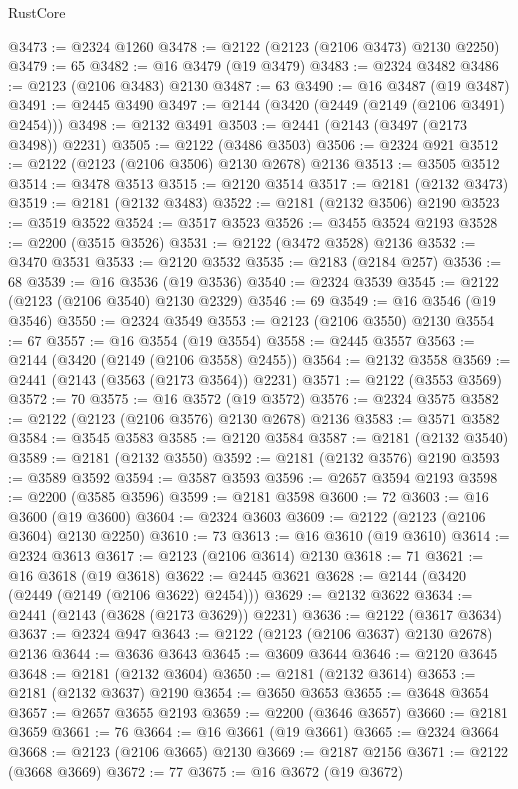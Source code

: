 \begin{lexlean}{RustCore}
\begin{coremodule}
@3473 := @2324 @1260
@3478 := @2122 (@2123 (@2106 @3473) @2130 @2250)
@3479 := 65
@3482 := @16 @3479 (@19 @3479)
@3483 := @2324 @3482
@3486 := @2123 (@2106 @3483) @2130
@3487 := 63
@3490 := @16 @3487 (@19 @3487)
@3491 := @2445 @3490
@3497 := @2144 (@3420 (@2449 (@2149 (@2106 @3491) @2454)))
@3498 := @2132 @3491
@3503 := @2441 (@2143 (@3497 (@2173 @3498)) @2231)
@3505 := @2122 (@3486 @3503)
@3506 := @2324 @921
@3512 := @2122 (@2123 (@2106 @3506) @2130 @2678) @2136
@3513 := @3505 @3512
@3514 := @3478 @3513
@3515 := @2120 @3514
@3517 := @2181 (@2132 @3473)
@3519 := @2181 (@2132 @3483)
@3522 := @2181 (@2132 @3506) @2190
@3523 := @3519 @3522
@3524 := @3517 @3523
@3526 := @3455 @3524 @2193
@3528 := @2200 (@3515 @3526)
@3531 := @2122 (@3472 @3528) @2136
@3532 := @3470 @3531
@3533 := @2120 @3532
@3535 := @2183 (@2184 @257)
@3536 := 68
@3539 := @16 @3536 (@19 @3536)
@3540 := @2324 @3539
@3545 := @2122 (@2123 (@2106 @3540) @2130 @2329)
@3546 := 69
@3549 := @16 @3546 (@19 @3546)
@3550 := @2324 @3549
@3553 := @2123 (@2106 @3550) @2130
@3554 := 67
@3557 := @16 @3554 (@19 @3554)
@3558 := @2445 @3557
@3563 := @2144 (@3420 (@2149 (@2106 @3558) @2455))
@3564 := @2132 @3558
@3569 := @2441 (@2143 (@3563 (@2173 @3564)) @2231)
@3571 := @2122 (@3553 @3569)
@3572 := 70
@3575 := @16 @3572 (@19 @3572)
@3576 := @2324 @3575
@3582 := @2122 (@2123 (@2106 @3576) @2130 @2678) @2136
@3583 := @3571 @3582
@3584 := @3545 @3583
@3585 := @2120 @3584
@3587 := @2181 (@2132 @3540)
@3589 := @2181 (@2132 @3550)
@3592 := @2181 (@2132 @3576) @2190
@3593 := @3589 @3592
@3594 := @3587 @3593
@3596 := @2657 @3594 @2193
@3598 := @2200 (@3585 @3596)
@3599 := @2181 @3598
@3600 := 72
@3603 := @16 @3600 (@19 @3600)
@3604 := @2324 @3603
@3609 := @2122 (@2123 (@2106 @3604) @2130 @2250)
@3610 := 73
@3613 := @16 @3610 (@19 @3610)
@3614 := @2324 @3613
@3617 := @2123 (@2106 @3614) @2130
@3618 := 71
@3621 := @16 @3618 (@19 @3618)
@3622 := @2445 @3621
@3628 := @2144 (@3420 (@2449 (@2149 (@2106 @3622) @2454)))
@3629 := @2132 @3622
@3634 := @2441 (@2143 (@3628 (@2173 @3629)) @2231)
@3636 := @2122 (@3617 @3634)
@3637 := @2324 @947
@3643 := @2122 (@2123 (@2106 @3637) @2130 @2678) @2136
@3644 := @3636 @3643
@3645 := @3609 @3644
@3646 := @2120 @3645
@3648 := @2181 (@2132 @3604)
@3650 := @2181 (@2132 @3614)
@3653 := @2181 (@2132 @3637) @2190
@3654 := @3650 @3653
@3655 := @3648 @3654
@3657 := @2657 @3655 @2193
@3659 := @2200 (@3646 @3657)
@3660 := @2181 @3659
@3661 := 76
@3664 := @16 @3661 (@19 @3661)
@3665 := @2324 @3664
@3668 := @2123 (@2106 @3665) @2130
@3669 := @2187 @2156
@3671 := @2122 (@3668 @3669)
@3672 := 77
@3675 := @16 @3672 (@19 @3672)

\end{coremodule}
\end{lexlean}
